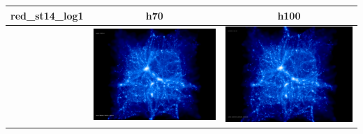\begin{itemize}
\begin{table}[p]
\begin{tabular}{l|c|c}
\end{tabular}
\end{table}
\begin{table}[p]
\centering
\begin{tabular}{l|c|c}
red\_st14\_log1 & h70 & h100 \\
\hline 
 & \includegraphics[scale=0.075]{r256/h70/red_st14_log1/197.jpg} & \includegraphics[scale=0.075]{r256/h100/red_st14_log1/197.jpg} \\

\end{tabular}
\end{table}
\end{itemize}
